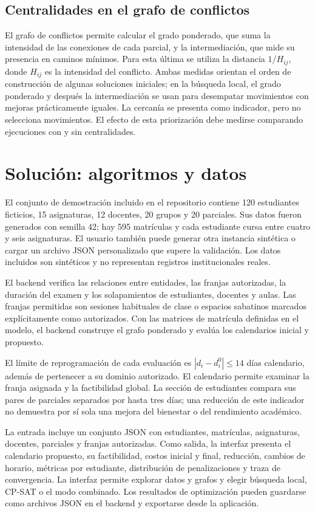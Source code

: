 \documentclass[12pt,letterpaper]{article}
\begin{document}
\subsection{Centralidades en el grafo de conflictos}
El grafo de conflictos permite calcular el grado ponderado, que suma la intensidad de las conexiones de cada parcial, y la intermediación, que mide su presencia en caminos mínimos. Para esta última se utiliza la distancia $1/H_{ij}$, donde $H_{ij}$ es la intensidad del conflicto. Ambas medidas orientan el orden de construcción de algunas soluciones iniciales; en la búsqueda local, el grado ponderado y después la intermediación se usan para desempatar movimientos con mejoras prácticamente iguales. La cercanía se presenta como indicador, pero no selecciona movimientos. El efecto de esta priorización debe medirse comparando ejecuciones con y sin centralidades.

\section{Solución: algoritmos y datos}
El conjunto de demostración incluido en el repositorio contiene 120 estudiantes ficticios, 15 asignaturas, 12 docentes, 20 grupos y 20 parciales. Sus datos fueron generados con semilla 42; hay 595 matrículas y cada estudiante cursa entre cuatro y seis asignaturas. El usuario también puede generar otra instancia sintética o cargar un archivo JSON personalizado que supere la validación. Los datos incluidos son sintéticos y no representan registros institucionales reales.

El backend verifica las relaciones entre entidades, las franjas autorizadas, la duración del examen y los solapamientos de estudiantes, docentes y aulas. Las franjas permitidas son sesiones habituales de clase o espacios sabatinos marcados explícitamente como autorizados. Con las matrices de matrícula definidas en el modelo, el backend construye el grafo ponderado y evalúa los calendarios inicial y propuesto.

El límite de reprogramación de cada evaluación es $|d_i-d_i^0|\leq 14$ días calendario, además de pertenecer a su dominio autorizado. El calendario permite examinar la franja asignada y la factibilidad global. La sección de estudiantes compara sus pares de parciales separados por hasta tres días; una reducción de este indicador no demuestra por sí sola una mejora del bienestar o del rendimiento académico.

La entrada incluye un conjunto JSON con estudiantes, matrículas, asignaturas, docentes, parciales y franjas autorizadas. Como salida, la interfaz presenta el calendario propuesto, su factibilidad, costos inicial y final, reducción, cambios de horario, métricas por estudiante, distribución de penalizaciones y traza de convergencia. La interfaz permite explorar datos y grafos y elegir búsqueda local, CP-SAT o el modo combinado. Los resultados de optimización pueden guardarse como archivos JSON en el backend y exportarse desde la aplicación.
\end{document}
